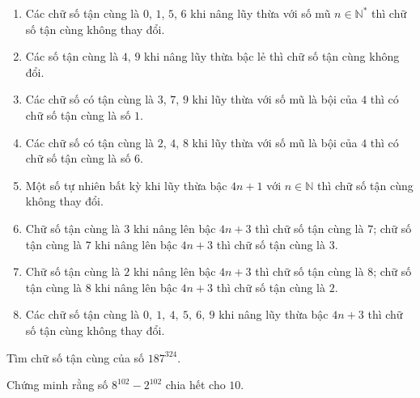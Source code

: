 \begin{dang}
	\begin{enumerate}[\tickEX]
		\item  Các chữ số tận cùng là $ 0 $, $ 1 $, $ 5 $, $ 6$ khi nâng lũy thừa với số mũ $ n \in \mathbb{N}^* $ thì chữ số tận cùng không thay đổi.
		\item Các số tận cùng là $ 4 $, $ 9 $ khi nâng lũy thừa bậc lẻ thì chữ số tận cùng không đổi.
		\item Các chữ số có tận cùng là $ 3 $, $ 7 $, $ 9$ khi lũy thừa với số mũ là bội của $ 4 $ thì có chữ số tận cùng là số $ 1 $.
		\item Các chữ số có tận cùng là $ 2 $, $ 4 $, $ 8 $ khi lũy thừa với số mũ là bội của $ 4 $ thì có chữ số tận cùng là số $ 6 $.
		\item Một số tự nhiên bất kỳ khi lũy thừa bậc $ 4n+1 $ với $ n \in \mathbb{N} $ thì chữ số tận cùng không thay đổi.
		\item Chữ số tận cùng là $ 3 $ khi nâng lên bậc $ 4n+3 $ thì chữ số tận cùng là $ 7 $; chữ số tận cùng là $ 7 $ khi nâng lên bậc $ 4n+3 $ thì chữ số tận cùng là $ 3 $.
		\item Chữ số tận cùng là $ 2 $ khi nâng lên bậc $ 4n+3 $ thì chữ số tận cùng là $ 8 $; chữ số tận cùng là $ 8 $ khi nâng lên bậc $ 4n+3 $ thì chữ số tận cùng là $ 2 $.
		\item Các chữ số tận cùng là $ 0, \ 1, \ 4, \ 5, \ 6, \ 9 $ khi nâng lũy thừa bậc $ 4n+3 $ thì chữ số tận cùng không thay đổi.
	\end{enumerate}
\end{dang}
\begin{vd}
Tìm chữ số tận cùng của số  $ 187^{324} $.
\end{vd}
\begin{vd}
Chứng minh rằng số $ 8^{102}-2^{102} $ chia hết cho $ 10 $.
\end{vd}

